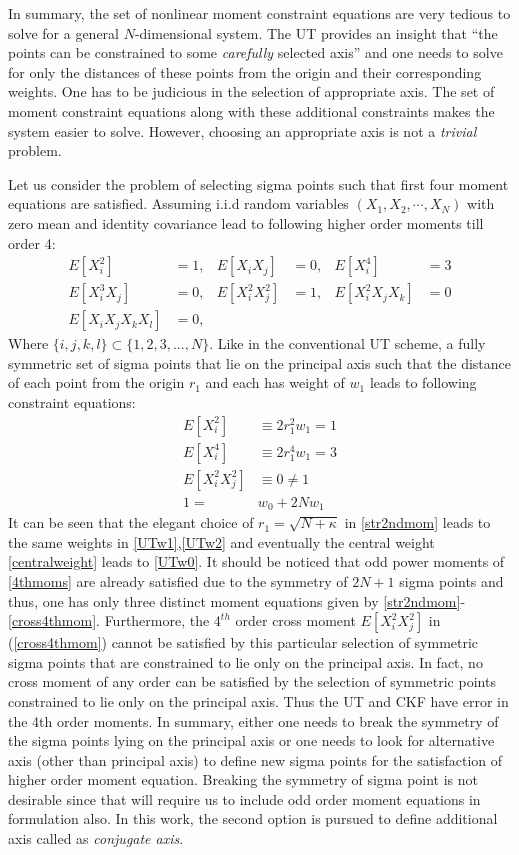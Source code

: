 \documentclass[letterpaper, 10 pt, conference]{IEEEtran}  %
\begin{document}
In summary, the set of nonlinear moment constraint equations are very tedious to solve for a general $N$-dimensional system. The UT provides an insight that ``the points can be constrained to some \emph{carefully} selected axis'' and one needs to solve for only the distances of these points from the origin and their corresponding weights. One has to be judicious in the selection of appropriate axis. The set of moment constraint equations along with these additional constraints makes the system easier to solve. However, choosing an appropriate axis is not a \emph{trivial} problem. 

Let us consider the problem of selecting sigma points such that first four moment equations are satisfied. Assuming i.i.d random variables $(X_1,X_2,\cdots,X_N)$ with zero mean and identity covariance lead to following higher order moments till order 4:
\begin{align}
E[X_i^2]&=1, &E[X_iX_j]&=0,  &E[X_i^4]&=3 \nonumber\\
E[X_i^3X_j]&=0, &E[X_i^2X_j^2]&=1, &E[X_i^2X_jX_k]&=0 \nonumber\\
E[X_iX_jX_kX_l]&=0,& & & &\label{4thmoms}
\end{align}
Where $\{i,j,k,l\}\subset\{1,2,3,...,N\}$. Like in the conventional UT scheme, a fully symmetric set of sigma points that lie on the principal axis such that the distance of each point from the origin $r_1$ and each has weight of $w_1$ leads to following constraint equations:
\begin{align}
E[X_i^2]     &\equiv 2r_1^2w_1=1 \label{str2ndmom}\\
E[X_i^4]     &\equiv 2r_1^4w_1=3 \label{str4thmom}\\
E[X_i^2X_j^2]&\equiv       0  \neq1 \label{cross4thmom}\\
1=&w_0+2Nw_1\label{centralweight}
\end{align}
It can be seen that the elegant choice of $r_1=\sqrt{N+\kappa}$ in \eqref{str2ndmom} leads to the same weights in \eqref{UTw1},\eqref{UTw2} and eventually the central weight \eqref{centralweight} leads to \eqref{UTw0}. It should be noticed that odd power moments of \eqref{4thmoms} are already satisfied due to the symmetry of $2N+1$ sigma points and thus, one has only three distinct moment equations given by \eqref{str2ndmom}-\eqref{cross4thmom}.  Furthermore, the $4^{th}$ order cross moment $E[X_i^2X_j^2]$ in (\ref{cross4thmom}) cannot be satisfied by this particular selection of symmetric sigma points that are constrained to lie only on the principal axis. In fact, no cross moment of any order can be satisfied by the selection of symmetric points constrained to lie only on the principal axis. Thus the UT and CKF have error in the 4th order moments. In summary, either one needs to break the symmetry of the sigma points lying on the principal axis or one needs to look for alternative axis (other than principal axis) to define new sigma points for the satisfaction of higher order moment equation. Breaking the symmetry of sigma point is not desirable since that will require us to include odd order moment equations in formulation also. In this work, the second option is pursued to define additional axis called as \textit{conjugate axis}.
\end{document}
